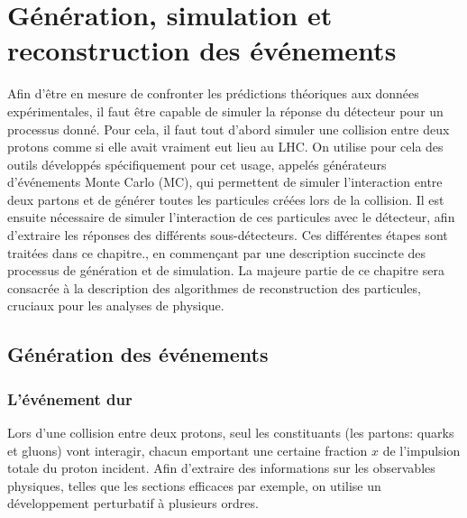 \chapter{Génération, simulation et reconstruction des événements} \label{chap:reco}

Afin d'être en mesure de confronter les prédictions théoriques aux données expérimentales, il faut être capable de simuler la réponse du détecteur pour un processus donné. Pour cela, il faut tout d'abord simuler une collision entre deux protons comme si elle avait vraiment eut lieu au LHC. On utilise pour cela des outils développés spécifiquement pour cet usage, appelés générateurs d'événements Monte Carlo (MC), qui permettent de simuler l'interaction entre deux partons et de générer toutes les particules créées lors de la collision. Il est ensuite nécessaire de simuler l'interaction de ces particules avec le détecteur, afin d'extraire les réponses des différents sous-détecteurs. Ces différentes étapes sont traitées dans ce chapitre., en commençant par une description succincte des processus de génération et de simulation. La majeure partie de ce chapitre sera consacrée à la description des algorithmes de reconstruction des particules, cruciaux pour les analyses de physique.

\section{Génération des événements}



\subsection{L'événement dur}

Lors d'une collision entre deux protons, seul les constituants (les partons: quarks et gluons) vont interagir, chacun emportant une certaine fraction $x$ de l'impulsion totale du proton incident. Afin d'extraire des informations sur les observables physiques, telles que les sections efficaces par exemple, on utilise un développement perturbatif à plusieurs ordres.

